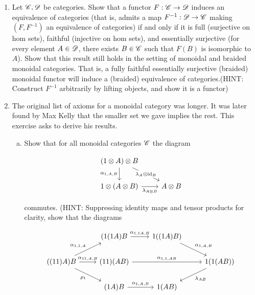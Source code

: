\documentclass{article}
\theoremstyle{definition}
\numberwithin{figure}{section}
\begin{document}
\begin{enumerate}[\thesection .1.]
\item Let $\mathscr{C},\mathscr{D}$ be categories. Show that a functor $F:\mathscr{C}\to \mathscr{D}$ induces an equivalence of categories (that is, admits a map $F^{-1}:\mathscr{D}\to \mathscr{C}$ making $(F,F^{-1})$ an equivalence of categories) if and only if it is full (surjective on hom sets), faithful (injective on hom sets), and essentially surjective (for every element $A\in \mathscr{D}$, there exists $B\in \mathscr{C}$ such that $F(B)$ is isomorphic to $A$). Show that this result still holds in the setting of monoidal and braided monoidal categories. That is, a fully faithful essentially surjective (braided) monoidal functor will induce a (braided) equivalence of categories.(HINT: Construct $F^{-1}$ arbitrarily by lifting objects, and show it is a functor)

\item The original list of axioms for a monoidal category was longer. It was later found by Max Kelly \cite{kelly1964maclane} that the smaller set we gave implies the rest. This exercise asks to derive his results.

\begin{enumerate}[(a)]

\item Show that for all monoidal categories $\mathscr{C}$ the diagram

\[\begin{tikzcd}
	{(1\otimes A)\otimes B} \\
	{1\otimes (A\otimes B)} & {A\otimes B}
	\arrow["{\lambda_A\otimes\id_{B}}"{description}, from=1-1, to=2-2]
	\arrow["{\alpha_{1,A,B}}"', from=1-1, to=2-1]
	\arrow["{\lambda_{A\otimes B}}"', from=2-1, to=2-2]
\end{tikzcd}\]

commutes. (HINT: Suppressing identity maps and tensor products for clarity, show that the diagrams

\[\begin{tikzcd}
	& {(1(1A)B} & {1((1A)B)} \\
	{((11)A)B} & {(11)(AB)} && {1(1(AB))} \\
	& {(1A)B} & {1(AB)}
	\arrow["{\rho_1}"', from=2-1, to=3-2]
	\arrow["{\alpha_{1,1,A}}", from=2-1, to=1-2]
	\arrow["{\alpha_{1,1A,B}}", from=1-2, to=1-3]
	\arrow["{\alpha_{1,A,B}}", from=1-3, to=2-4]
	\arrow["{\alpha_{1,A,B}}", from=3-2, to=3-3]
	\arrow["{\lambda_{AB}}", from=2-4, to=3-3]
	\arrow["{\alpha_{11,A,B}}", from=2-1, to=2-2]
	\arrow["{\alpha_{1,1,AB}}", from=2-2, to=2-4]
\end{tikzcd}\]


\end{enumerate}
\end{enumerate}
\end{document}
